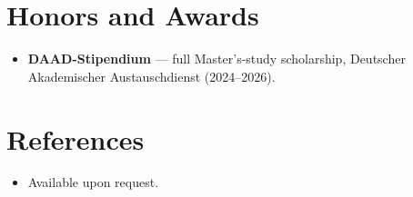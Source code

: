 \documentclass[11pt,a4paper,sans]{moderncv}
\begin{document}

\section{Honors and Awards}
\vspace{1pt}
\begin{itemize}
\item{\textbf{DAAD-Stipendium} --- full Master's-study scholarship, Deutscher Akademischer Austauschdienst (2024--2026).}
\end{itemize}


\section{References}
\vspace{1pt}
\begin{itemize}
\item{Available upon request.}
\end{itemize}
\end{document}
